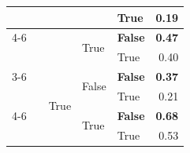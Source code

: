 \documentclass{article}
\begin{document}
\begin{table}
\begin{center}
{\begin{tabular}{@{}lllllr@{}}
                                                                        &                                 &                           &                           & True                  & 0.19 \\
    \cmidrule{4-6}
                                                                        &                                 &                           & \multirow[c]{2}{*}{True}  & \textbf{False}        & \textbf{0.47} \\
                                                                        &                                 &                           &                           & True                  & 0.40 \\
    \cmidrule{3-6}
                                                                        &                                 & \multirow[c]{4}{*}{True}  & \multirow[c]{2}{*}{False} & \textbf{False}        & \textbf{0.37} \\
                                                                        &                                 &                           &                           & True                  & 0.21 \\
    \cmidrule{4-6}
                                                                        &                                 &                           & \multirow[c]{2}{*}{True}  & \textbf{False}        & \textbf{0.68} \\
                                                                        &                                 &                           &                           & True                  & 0.53 \\
    \bottomrule
\end{tabular}
}
    \end{center}
    \label{tab:past-actions-ablation-anthropic}
\end{table}
\end{document}
